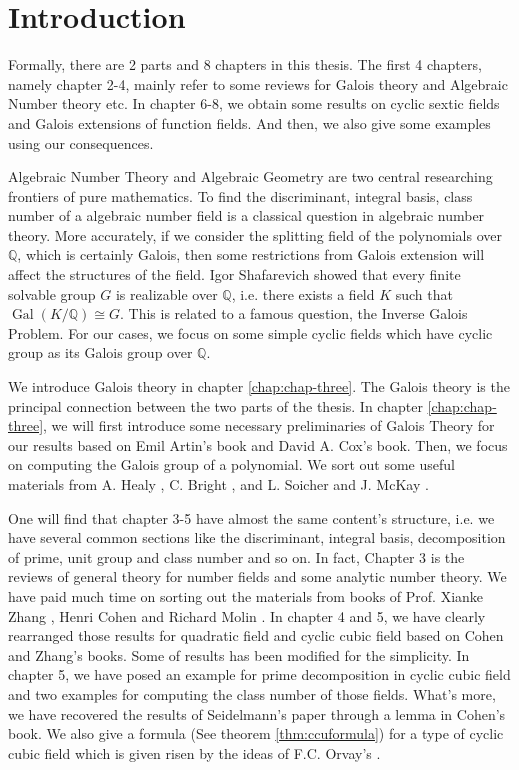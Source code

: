 \chapter{Introduction}
\label{chp:introduction}
Formally, there are 2 parts and 8 chapters in this thesis. The first 4 chapters, namely chapter 2-4, mainly refer to some reviews for Galois theory and Algebraic Number theory etc. In chapter 6-8, we obtain some results on cyclic sextic fields and Galois extensions of function fields. And then, we also give some examples using our consequences. 

Algebraic Number Theory and Algebraic Geometry are two central researching frontiers of pure mathematics. To find the discriminant, integral basis, class number of a algebraic number field is a classical question in algebraic number theory. More accurately, if we consider the splitting field of the polynomials over $\mathbb{Q}$, which is certainly Galois, then some restrictions from Galois extension will affect the structures of the field. Igor Shafarevich showed that every finite solvable group $G$ is realizable over $\mathbb{Q}$, i.e. there exists a field $K$ such that $\operatorname{Gal}(K/\mathbb{Q})\cong G$. This is related to a famous question, the Inverse Galois Problem. For our cases, we focus on some simple cyclic fields which have cyclic group as its Galois group over $\mathbb{Q}$. 

We introduce Galois theory in chapter \ref{chap:chap-three}. The Galois theory is the principal connection between the two parts of the thesis. In chapter \ref{chap:chap-three}, we will first introduce some necessary preliminaries of Galois Theory for our results based on Emil Artin's book \citep{artin1944galois} and David A. Cox's book\citep{cox2012galois}. Then, we focus on computing the Galois group of a polynomial. We sort out some useful materials from A. Healy \citep{healy2002resultants}, C. Bright \citep{bright2013computing}, and L. Soicher and J. McKay \citep{soicher1985computing}.

One will find that chapter 3-5 have almost the same content's structure, i.e. we have several common sections like the discriminant, integral basis, decomposition of prime, unit group and class number and so on. In fact, Chapter 3 is the reviews of general theory for number fields and some analytic number theory. We have paid much time on sorting out the materials from books of Prof. Xianke Zhang \citep{Xianke2006ANT}, Henri Cohen \citep{cohen1993course} and Richard Molin \citep{mollin1999algebraic}. In chapter 4 and 5, we have clearly rearranged those results for quadratic field and cyclic cubic field based on Cohen and Zhang's books. Some of results has been modified for the simplicity. In chapter 5, we have posed an example for prime decomposition in cyclic cubic field and two examples for computing the class number of those fields. What's more, we have recovered the results of Seidelmann's paper \citep{seidelmann1917gesamtheit} through a lemma in Cohen's book. We also give a formula (See theorem \ref{thm:ccuformula}) for a type of cyclic cubic field which is given risen by the ideas of F.C. Orvay's \citep{orvay1991cyclic}.


